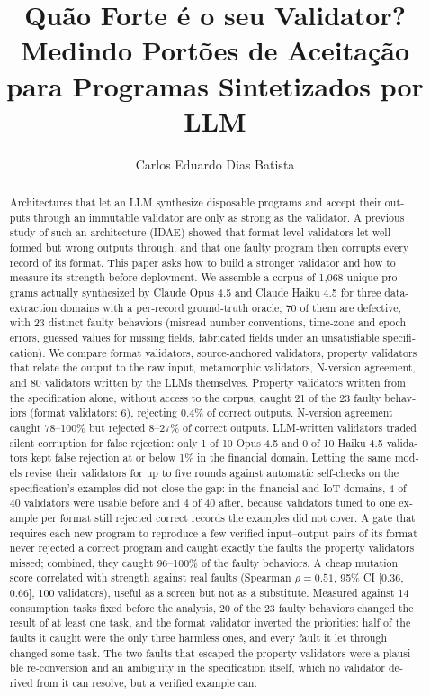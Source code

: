 \documentclass[sigconf,nonacm]{acmart}
\begin{document}
\title[Quão Forte é o seu Validator?]{Quão Forte é o seu Validator? Medindo Portões de Aceitação para Programas Sintetizados por LLM}

\author{Carlos Eduardo Dias Batista}

\renewcommand{\shortauthors}{Batista}

\begin{abstract}
\begin{otherlanguage}{english}
Architectures that let an LLM synthesize disposable programs and accept their outputs through an immutable validator are only as strong as the validator. A previous study of such an architecture (IDAE) showed that format-level validators let well-formed but wrong outputs through, and that one faulty program then corrupts every record of its format. This paper asks how to build a stronger validator and how to measure its strength before deployment. We assemble a corpus of 1{,}068 unique programs actually synthesized by Claude Opus 4.5 and Claude Haiku 4.5 for three data-extraction domains with a per-record ground-truth oracle; 70 of them are defective, with 23 distinct faulty behaviors (misread number conventions, time-zone and epoch errors, guessed values for missing fields, fabricated fields under an unsatisfiable specification). We compare format validators, source-anchored validators, property validators that relate the output to the raw input, metamorphic validators, N-version agreement, and 80 validators written by the LLMs themselves. Property validators written from the specification alone, without access to the corpus, caught 21 of the 23 faulty behaviors (format validators: 6), rejecting 0.4\% of correct outputs. N-version agreement caught 78--100\% but rejected 8--27\% of correct outputs. LLM-written validators traded silent corruption for false rejection: only 1 of 10 Opus 4.5 and 0 of 10 Haiku 4.5 validators kept false rejection at or below 1\% in the financial domain. Letting the same models revise their validators for up to five rounds against automatic self-checks on the specification's examples did not close the gap: in the financial and IoT domains, 4 of 40 validators were usable before and 4 of 40 after, because validators tuned to one example per format still rejected correct records the examples did not cover. A gate that requires each new program to reproduce a few verified input--output pairs of its format never rejected a correct program and caught exactly the faults the property validators missed; combined, they caught 96--100\% of the faulty behaviors. A cheap mutation score correlated with strength against real faults (Spearman $\rho = 0.51$, 95\% CI [0.36, 0.66], 100 validators), useful as a screen but not as a substitute. Measured against 14 consumption tasks fixed before the analysis, 20 of the 23 faulty behaviors changed the result of at least one task, and the format validator inverted the priorities: half of the faults it caught were the only three harmless ones, and every fault it let through changed some task. The two faults that escaped the property validators were a plausible re-conversion and an ambiguity in the specification itself, which no validator derived from it can resolve, but a verified example can.

\end{otherlanguage}
\end{abstract}
\end{document}
